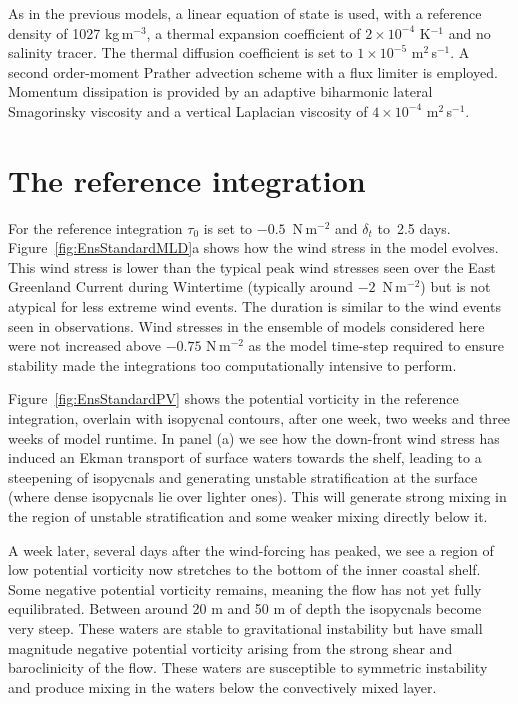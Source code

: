 As in the previous models, a linear equation of state is used, with a reference density of 1027 kg\,m$^{-3}$, a thermal expansion coefficient of $2 \times 10^{-4}$ K$^{-1}$ and no salinity tracer. The thermal diffusion coefficient is set to $1 \times 10^{-5}$ m$^2$\,s$^{-1}$. A second order-moment Prather advection scheme with a flux limiter is employed. Momentum dissipation is provided by an adaptive biharmonic lateral Smagorinsky viscosity and a vertical Laplacian viscosity of $4 \times 10^{-4}$ m$^2$\,s$^{-1}$.  

\section{The reference integration}
\label{sec:IrmRef}
For the reference integration $\tau_0$ is set to $-0.5$~N\,m$^{-2}$ and $\delta_t$ to~2.5 days. Figure~\ref{fig:EnsStandardMLD}a shows how the wind stress in the model evolves. This wind stress is lower than the typical peak wind stresses seen over the East Greenland Current during Wintertime (typically around $-2$~N\,m$^{-2}$) but is not atypical for less extreme wind events. The duration is similar to the wind events seen in observations. Wind stresses in the ensemble of models considered here were not increased above $-0.75$ N\,m$^{-2}$ as the model time-step required to ensure stability made the integrations too computationally intensive to perform.

Figure~\ref{fig:EnsStandardPV} shows the potential vorticity in the reference integration, overlain with isopycnal contours, after one week, two weeks and three weeks of model runtime. In panel (a) we see how the down-front wind stress has induced an Ekman transport of surface waters towards the shelf, leading to a steepening of isopycnals and generating unstable stratification at the surface (where dense isopycnals lie over lighter ones). This will generate strong mixing in the region of unstable stratification and some weaker mixing directly below it.

A week later, several days after the wind-forcing has peaked, we see a region of low potential vorticity now stretches to the bottom of the inner coastal shelf. Some negative potential vorticity remains, meaning the flow has not yet fully equilibrated. Between around 20 m and 50 m of depth the isopycnals become very steep. These waters are stable to gravitational instability but have small magnitude negative potential vorticity arising from the strong shear and baroclinicity of the flow. These waters are susceptible to symmetric instability and produce mixing in the waters below the convectively mixed layer.

